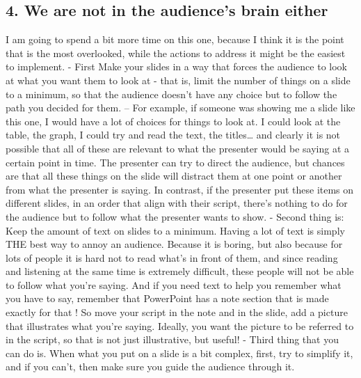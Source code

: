 \documentclass[
]{book}
\begin{document}
\hypertarget{we-are-not-in-the-audiences-brain-either}{%
\subsection{4. We are not in the audience's brain either}\label{we-are-not-in-the-audiences-brain-either}}

I am going to spend a bit more time on this one, because I think it is the point that is the most overlooked, while the actions to address it might be the easiest to implement.
- First Make your slides in a way that forces the audience to look at what you want them to look at - that is, limit the number of things on a slide to a minimum, so that the audience doesn't have any choice but to follow the path you decided for them. -- For example, if someone was showing me a slide like this one, I would have a lot of choices for things to look at. I could look at the table, the graph, I could try and read the text, the titles\ldots{} and clearly it is not possible that all of these are relevant to what the presenter would be saying at a certain point in time. The presenter can try to direct the audience, but chances are that all these things on the slide will distract them at one point or another from what the presenter is saying. In contrast, if the presenter put these items on different slides, in an order that align with their script, there's nothing to do for the audience but to follow what the presenter wants to show.
- Second thing is: Keep the amount of text on slides to a minimum. Having a lot of text is simply THE best way to annoy an audience. Because it is boring, but also because for lots of people it is hard not to read what's in front of them, and since reading and listening at the same time is extremely difficult, these people will not be able to follow what you're saying. And if you need text to help you remember what you have to say, remember that PowerPoint has a note section that is made exactly for that ! So move your script in the note and in the slide, add a picture that illustrates what you're saying. Ideally, you want the picture to be referred to in the script, so that is not just illustrative, but useful!
- Third thing that you can do is. When what you put on a slide is a bit complex, first, try to simplify it, and if you can't, then make sure you guide the audience through it.
\end{document}
